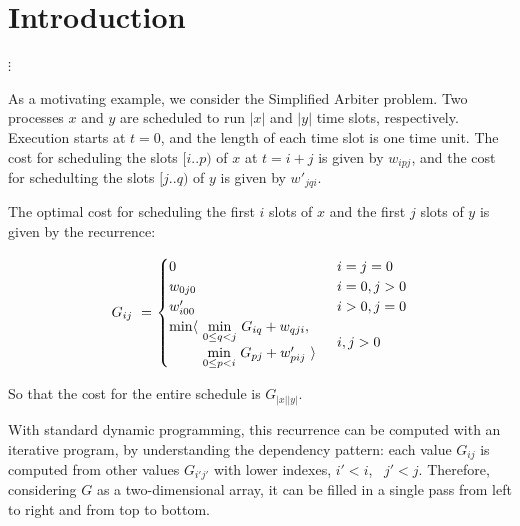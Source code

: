 \section{Introduction}
\label{intro}

\begin{center}$\vdots$\end{center}

As a motivating example, we consider the Simplified Arbiter problem.
Two processes $x$ and $y$ are scheduled to run $|x|$ and $|y|$ time slots,
respectively. Execution starts at $t=0$, and the length of each time slot is
one time unit. The cost for scheduling the slots $[i..p)$ of $x$ at $t=i+j$
is given by $w_{ipj}$, and the cost for schedulting the slots $[j..q)$ of $y$
is given by $w'_{jqi}$.

The optimal cost for scheduling the first $i$ slots of $x$ and the first $j$ slots
of $y$ is given by the recurrence:

\begin{equation}
\renewcommand\arraystretch{1.5}
\begin{array}{l@{}l}
	G_{ij} ~=~  &
	\begin{cases}
		0                        & i=j=0 \\
		w_{0j0}                  & i=0, j>0 \\
		w'_{i00}                 & i>0, j=0 \\
		\begin{array}{@{}l@{~}l}
		  \min\langle & \underset{0\leq q<j}\min ~ G_{iq} + w_{qji}, \\
		              & \underset{0\leq p<i}\min ~ G_{pj} + w'_{pij}~\rangle
		\end{array}              & i,j>0
	\end{cases}
\end{array}
\label{intro:gap spec}
\end{equation}

\smallskip\noindent
So that the cost for the entire schedule is $G_{|x||y|}$.

\medskip
With standard dynamic programming, this recurrence can be computed
with an iterative program, by understanding the dependency pattern:
each value $G_{ij}$ is computed from other values $G_{i'j'}$ with lower
indexes, $i'<i$, ~$j'<j$. Therefore, considering $G$ as a two-dimensional
array, it can be filled in a single pass from left to right and from top
to bottom.

\newcommand\FORLINE[1]{\STATE\algorithmicfor~{#1} \algorithmicdo~}

